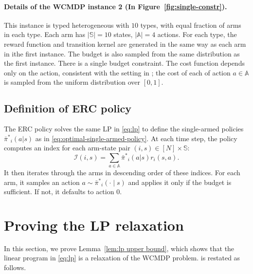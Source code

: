 \documentclass{article}
\theoremstyle{plain}
\theoremstyle{remark}
\newcommand{\sspa}{\mathbb{S}}
\newcommand{\aspa}{\mathbb{A}}
\newcommand{\pibar}{{\sysbar{\pi}}}
\newcommand{\pibs}{{\pibar^*}}
\newcommand{\sysbar}[1]{\bar{#1}}
\begin{document}
\paragraph{Details of the WCMDP instance 2 (In Figure~\ref{fig:single-constr}).}
This instance is typed heterogeneous with $10$ types, with equal fraction of arms in each type. Each arm has $|\sspa| = 10$ states, $|\aspa| = 4$ actions. 
For each type, the reward function and transition kernel are generated in the same way as each arm in ithe first instance. The budget is also sampled from the same distribution as the first instance. 
There is a single budget constraint. The cost function depends only on the action, consistent with the setting in \citep{XioWanLi_22}; the cost of each of action $a\in\aspa$ is sampled from the uniform distribution over $[0,1]$. 



\subsection{Definition of ERC policy}
\label{app:erc_details}

The ERC policy \citep{XioWanLi_22} solves the same LP in \eqref{eq:lp} to define the single-armed policies $\pibs_i(a|s)$ as in \eqref{eq:optimal-single-armed-policy}. At each time step, the policy computes an index for each arm-state pair $(i,s) \in [N] \times \sspa$:
\[
    \mathcal{I}(i,s) = \sum_{a\in\aspa} \pibs_i(a|s) r_i(s,a).
\]
It then iterates through the arms in descending order of these indices. For each arm, it samples an action $a \sim \pibs_i(\cdot \mid s)$ and applies it only if the budget is sufficient. If not, it defaults to action 0. %



\section{Proving the LP relaxation}\label{app:proof-lem-lp-upper-bound}
In this section, we prove Lemma~\ref{lem:lp upper bound}, which shows that the linear program in \eqref{eq:lp} is a relaxation of the WCMDP problem.  is restated as follows.  

\lprelaxation*
\end{document}
